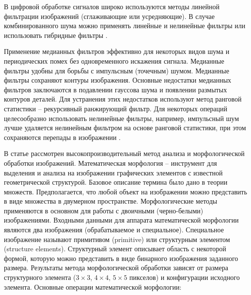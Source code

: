 В цифровой обработке сигналов широко используются методы линейной фильтрации изображений (сглаживающие или усредняющие). В случае комбинированного шума можно применять линейные и нелинейные фильтры или использовать гибридные фильтры 
\cite{Soynikova2016high-performance}.

Применение медианных фильтров эффективно для некоторых видов шума и периодических помех без одновременного искажения сигнала. Медианные фильтры удобны для борьбы с импульсным (точечным) шумом. Медианные фильтры сохраняют контуры изображения. Основные недостатки медианных фильтров заключаются в подавлении гауссова шума и появлении размытых контуров деталей. Для устранения этих
недостатков используют метод ранговой статистики – рекурсивный ранжирующий фильтр. Для некоторых операций целесообразно использовать нелинейные фильтры, например, импульсный шум лучше удаляется нелинейным фильтром на основе ранговой статистики, при этом сохраняются перепады в изображении \cite{gruzman2002digital}.

В статье \cite{7025588}рассмотрен высокопроизводительный метод анализа и морфологической обработки изображений. 
Математическая морфология – инструмент для выделения и анализа на изображении графических элементов с известной геометрической структурой. Базовое описание термина было дано в теории множеств. Предполагается, что любой объект на изображении можно представить в виде множества в двумерном пространстве. Морфологические методы применяются в основном для работы с двоичными (черно-белыми) изображениями. Входными данными для аппарата математической морфологии являются два изображения (обрабатываемое и специальное). Специальное изображение называют примитивом (primitive) или структурным элементом (structure elements). Структурный элемент описывает область с некоторой формой, которую можно представить в виде бинарного изображения заданного размера. Результаты метода морфологической обработки зависят от размера структурного элемента ($3\times3$, $4\times4$, $5\times5$ пикселов) и конфигурации исходного элемента. Основные операции математической морфологии:

